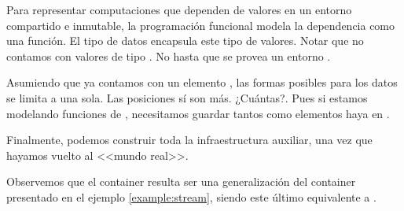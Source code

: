 
\begin{example}
  Para representar computaciones que dependen de valores en un entorno compartido e inmutable, la programación funcional modela la dependencia como una función. El tipo de datos   encapsula este tipo de valores. Notar que no contamos con valores de tipo . No hasta que se provea un entorno .


  Asumiendo que ya contamos con un elemento , las formas posibles para los datos se limita a una sola. Las posiciones sí son más. ¿Cuántas?. Pues si estamos modelando funciones de \AgdaSymbol{$\to$}, necesitamos guardar tantos  como elementos haya en .
  

Finalmente, podemos construir toda la infraestructura auxiliar, una vez que hayamos vuelto al <<mundo real>>. 


Observemos que el container  resulta ser una generalización del container  presentado en el ejemplo \ref{example:stream}, siendo este último equivalente a  \AgdaDatatype{$\Nat$}.

\end{example}
\vspace{2ex}



  



